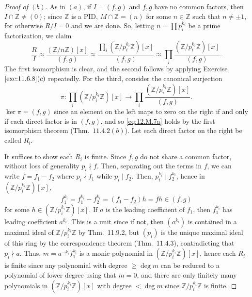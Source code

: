 \documentclass[12pt]{article}
\theoremstyle{remark}
\begin{document}
\begin{proof}[Proof of $(b)$]
  As in $(a)$, if $I = (f,g)$ and $f,g$ have no common factors, then $I \cap \mathbb{Z} \ne (0)$; since $\mathbb{Z}$ is a PID, $M \cap \mathbb{Z} = (n)$ for some $n \in \mathbb{Z}$ such that $n \ne \pm1$, for otherwise $R/I = 0$ and we are done. So, letting $n = \prod p_i^{k_i}$ be a prime factorization, we claim
  \begin{equation}\label{eq:12.M.7a}
    \frac{R}{I} \approx \frac{(\mathbb{Z}/n\mathbb{Z})[x]}{(f,g)} \approx \frac{\prod_i(\mathbb{Z}/p_i^{k_i}\mathbb{Z})[x]}{(f,g)} \approx \prod_i \frac{(\mathbb{Z}/p_i^{k_i}\mathbb{Z})[x]}{(f,g)}.
  \end{equation}
  The first isomorphism is clear, and the second follows by applying Exercise $\ref{exc:11.6.8}(c)$ repeatedly. For the third, consider the canonical surjection
  \begin{equation*}
    \pi\colon\prod_i(\mathbb{Z}/p_i^{k_i}\mathbb{Z})[x] \to \prod_i \frac{(\mathbb{Z}/p_i^{k_i}\mathbb{Z})[x]}{(f,g)}.
  \end{equation*}
  $\ker\pi = (f,g)$ since an element on the left maps to zero on the right if and only if each direct factor is in $(f,g)$, and so \eqref{eq:12.M.7a} holds by the first isomorphism theorem (Thm.~$11.4.2(b)$). Let each direct factor on the right be called $R_i$.
  \par It suffices to show each $R_i$ is finite. Since $f,g$ do not share a common factor, without loss of generality $p_i \nmid f$. Then, separating out the terms in $f$, we can write $f = f_1 - f_2$ where $p_i \nmid f_1$ while $p_i \mid f_2$. Then, $p_i^{k_i} \mid f_2^{k_i}$, hence in $(\mathbb{Z}/p_i^{k_i}\mathbb{Z})[x]$,
  \begin{equation*}
    f_1^{k_i} = f_1^{k_i} - f_2^{k_i} = (f_1-f_2)h = fh \in (f,g)
  \end{equation*}
  for some $h \in (\mathbb{Z}/p_i^{k_i}\mathbb{Z})[x]$. If $a$ is the leading coefficient of $f_1$, then $f_1^{k_i}$ has leading coefficient $a^{k_i}$. This is a unit since if not, then $(a^{k_i})$ is contained in a maximal ideal of $\mathbb{Z}/p_i^{k_i}\mathbb{Z}$ by Thm.~11.9.2, but $(p_i)$ is the unique maximal ideal of this ring by the correspondence theorem (Thm.~11.4.3), contradicting that $p_i \nmid a$. Thus, $m = a^{-k_i}f^{k_i}_1$ is a monic polynomial in $(\mathbb{Z}/p_i^{k_i}\mathbb{Z})[x]$, hence each $R_i$ is finite since any polynomial with degree $\ge \deg m$ can be reduced to a polynomial of lower degree using that $m = 0$, and there are only finitely many polynomials in $(\mathbb{Z}/p_i^{k_i}\mathbb{Z})[x]$ with degree $< \deg m$ since $\mathbb{Z}/p_i^{k_i}\mathbb{Z}$ is finite.
\end{proof}
\end{document}
